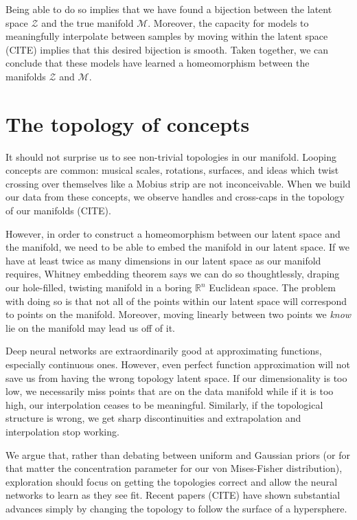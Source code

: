 \documentclass{article}
\begin{document}
Being able to do so implies that we have found a bijection between the latent space $\mathcal{Z}$ and the true manifold $\mathcal{M}$.
Moreover, the capacity for models to meaningfully interpolate between samples by moving within the latent space (CITE) implies that this desired bijection is smooth.
Taken together, we can conclude that these models have learned a homeomorphism between the manifolds $\mathcal{Z}$ and $\mathcal{M}$.

\section{The topology of concepts}

It should not surprise us to see non-trivial topologies in our manifold.
Looping concepts are common: musical scales, rotations, surfaces, and ideas which twist crossing over themselves like a Mobius strip are not inconceivable.
When we build our data from these concepts, we observe handles and cross-caps in the topology of our manifolds (CITE).

However, in order to construct a homeomorphism between our latent space and the manifold, we need to be able to embed the manifold in our latent space.
If we have at least twice as many dimensions in our latent space as our manifold requires, Whitney embedding theorem says we can do so thoughtlessly, draping our hole-filled, twisting manifold in a boring $\mathbb{R}^n$ Euclidean space.
The problem with doing so is that not all of the points within our latent space will correspond to points on the manifold.
Moreover, moving linearly between two points we \textit{know} lie on the manifold may lead us off of it.

Deep neural networks are extraordinarily good at approximating functions, especially continuous ones.
However, even perfect function approximation will not save us from having the wrong topology latent space.
If our dimensionality is too low, we necessarily miss points that are on the data manifold while if it is too high, our interpolation ceases to be meaningful.
Similarly, if the topological structure is wrong, we get sharp discontinuities and extrapolation and interpolation stop working.

We argue that, rather than debating between uniform and Gaussian priors (or for that matter the concentration parameter for our von Mises-Fisher distribution), exploration should focus on getting the topologies correct and allow the neural networks to learn as they see fit.
Recent papers (CITE) have shown substantial advances simply by changing the topology to follow the surface of a hypersphere.
\end{document}
